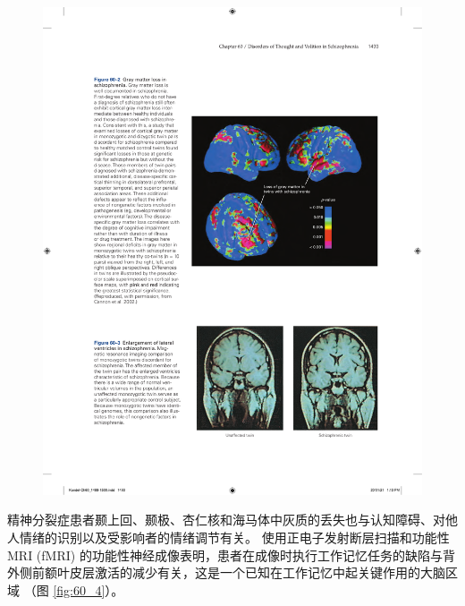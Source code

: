\begin{figure}[htbp]
	\centering
	\includegraphics[width=0.7\linewidth]{chap60/fig_60_3}
	\caption{}
	\label{fig:60_3}
\end{figure}


精神分裂症患者颞上回、颞极、杏仁核和海马体中灰质的丢失也与认知障碍、对他人情绪的识别以及受影响者的情绪调节有关。
使用正电子发射断层扫描和功能性 MRI (fMRI) 的功能性神经成像表明，患者在成像时执行工作记忆任务的缺陷与背外侧前额叶皮层激活的减少有关，这是一个已知在工作记忆中起关键作用的大脑区域 （图 \ref{fig:60_4}）。


